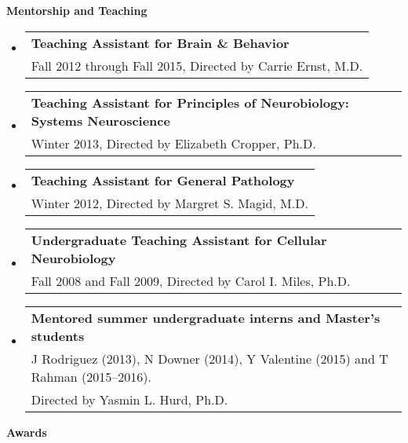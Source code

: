 \documentclass[10pt]{article}
\begin{document}
\vspace{0.1in}
{\large \textbf{Mentorship and Teaching}}

\begin{itemize}

\item
  \begin{tabular*}{6.5in}{l}
    \textbf{Teaching Assistant for Brain \& Behavior} \\
    Fall 2012 through Fall 2015, Directed by Carrie Ernst, M.D. \\
  \end{tabular*}
\item
  \begin{tabular*}{6.5in}{l}
    \textbf{Teaching Assistant for Principles of Neurobiology: Systems Neuroscience} \\
    Winter 2013, Directed by Elizabeth Cropper, Ph.D. \\
  \end{tabular*}
\item
  \begin{tabular*}{6.5in}{l}
    \textbf{Teaching Assistant for General Pathology} \\
    Winter 2012, Directed by Margret S. Magid, M.D. \\
  \end{tabular*}
\item
  \begin{tabular*}{6.5in}{l}
    \textbf{Undergraduate Teaching Assistant for Cellular Neurobiology} \\
    Fall 2008 and Fall 2009, Directed by Carol I. Miles, Ph.D. \\
  \end{tabular*}  
\item
  \begin{tabular*}{6.5in}{l}
    \textbf{Mentored summer undergraduate interns and Master's students} \\
    J Rodriguez (2013), N Downer (2014), Y Valentine (2015) and T Rahman (2015--2016).\\
    Directed by Yasmin L. Hurd, Ph.D. \\
  \end{tabular*}  
\end{itemize}

\vspace{0.1in}
{\large \textbf{Awards}}
\end{document}
